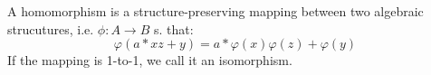 \begin{definition}[Homomorphisms]
    A homomorphism is a structure-preserving mapping between two algebraic strucutures, i.e. $\phi: A \to B$ s. that:
    \[\varphi(a*xz+y) = a*\varphi(x)\varphi(z) + \varphi(y)\]
    If the mapping is 1-to-1, we call it an isomorphism.
\end{definition}
